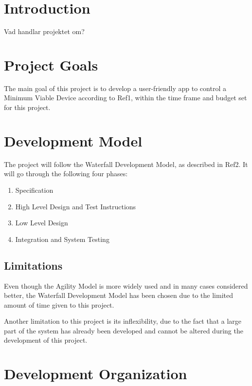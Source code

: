 \documentclass[a4paper]{article}
\begin{document}
\section{Introduction}
Vad handlar projektet om?

\section{Project Goals}
The main goal of this project is to develop a user-friendly app to control a Minimum Viable Device according to  Ref1, within the time frame and budget set for this project.

\section{Development Model}
The project will follow the Waterfall Development Model, as described in Ref2. It will go through the following four phases:

\begin{enumerate}
\item Specification
\item High Level Design and Test Instructions
\item Low Level Design
\item Integration and System Testing
\end{enumerate}

\subsection{Limitations}
Even though the Agility Model is more widely used and in many cases considered better, the Waterfall Development Model has been chosen due to the limited amount of time given to this project. 

Another limitation to this project is its inflexibility, due to the fact that a large part of the system has already been developed and cannot be altered during the development of this project.

\section{Development Organization}
\end{document}
